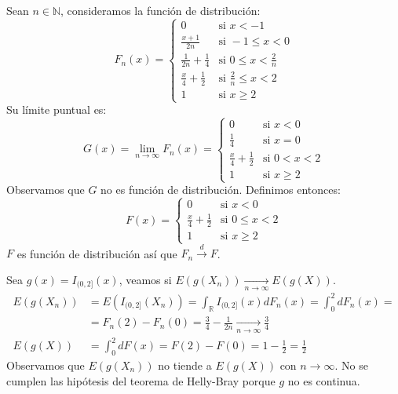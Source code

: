 \begin{example}
    Sean $n \in \mathbb{N}$, consideramos la función de distribución:
    $$F_n(x) = \begin{cases}
            0                          & \text{si } x < -1                 \\
            \frac{x+1}{2n}             & \text{si } -1 \leq x < 0          \\
            \frac{1}{2n} + \frac{1}{4} & \text{si } 0 \leq x < \frac{2}{n} \\
            \frac{x}{4} + \frac{1}{2}  & \text{si } \frac{2}{n} \leq x < 2 \\
            1                          & \text{si } x \geq 2
        \end{cases}$$
    Su límite puntual es:
    $$G(x) = \lim\limits_{n \to \infty} F_n(x) = \begin{cases}
            0                         & \text{si } x < 0     \\
            \frac{1}{4}               & \text{si } x = 0     \\
            \frac{x}{4} + \frac{1}{2} & \text{si } 0 < x < 2 \\
            1                         & \text{si } x \geq 2
        \end{cases}$$
    Observamos que $G$ no es función de distribución.
    Definimos entonces:
    $$F(x) = \begin{cases}
            0                         & \text{si } x < 0        \\
            \frac{x}{4} + \frac{1}{2} & \text{si } 0 \leq x < 2 \\
            1                         & \text{si } x \geq 2
        \end{cases}$$
    $F$ es función de distribución así que $F_n \xrightarrow{d} F$.

    Sea $g(x) = I_{(0,2]}(x)$, veamos si $E(g(X_n)) \xrightarrow[n \to \infty]{} E(g(X))$.
    \begin{align*}
        E(g(X_n)) & = E(I_{(0,2]}(X_n)) = \int_\mathbb{R} I_{(0,2]}(x) dF_n(x) = \int_0^2 dF_n(x) =         \\
                  & = F_n(2) - F_n(0) = \frac{3}{4} - \frac{1}{2n} \xrightarrow[n \to \infty]{} \frac{3}{4} \\
        E(g(X))   & = \int_0^2 dF(x) = F(2) - F(0) = 1 - \frac{1}{2} = \frac{1}{2}
    \end{align*}
    Observamos que $E(g(X_n))$ no tiende a $E(g(X))$ con $n \to \infty$.
    No se cumplen las hipótesis del teorema de Helly-Bray porque $g$ no es continua.


\end{example}
